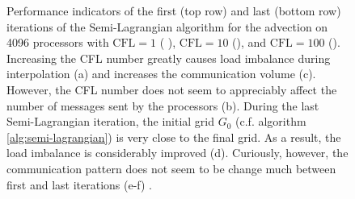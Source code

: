 \begin{figure}[htbp]
\begin{center}
	\end{center}
	\caption{Performance indicators of the first (top row) and last (bottom row) iterations of the Semi-Lagrangian algorithm for the advection on 4096 processors with $\text{CFL} = 1$ ( ), $\text{CFL} = 10$ (), and $\text{CFL} = 100$ (). Increasing the CFL number greatly causes load imbalance during interpolation (a) and increases the communication volume (c). However, the CFL number does not seem to appreciably affect the number of messages sent by the processors (b). During the last Semi-Lagrangian iteration, the initial grid $G_0$ (c.f. algorithm \ref{alg:semi-lagrangian}) is very close to the final grid. As a result, the load imbalance is considerably improved (d). Curiously, however, the communication pattern does not seem to be change much between first and last iterations (e-f) .}
	\label{fig:communication_4096}
\end{figure}

